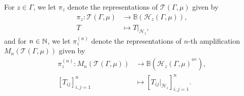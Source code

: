 \documentclass[12pt, class = article, crop = false, a4paper, twoside]{standalone}
\begin{document}
\begin{notation}

    For $z\in\Gamma$, we let $\pi_{z}$ denote the representations of $\mathcal{T}(\Gamma, \mu)$ given by
    \begin{equation}
        \begin{split}
            \pi_{z}\colon \mathcal{T}(\Gamma, \mu) & \to \mathbb{B}(\mathcal{H}_{z}(\Gamma, \mu)), \\
            T & \mapsto T|_{\mathcal{H}_{z}},
        \end{split}
    \end{equation}
    and for $n\in\mathbb{N}$, we let $\pi^{(n)}_{z}$ denote the representations of $n$-th amplification $M_{n}(\mathcal{T}(\Gamma, \mu))$ given by
    \begin{equation}
        \begin{split}
            \pi^{(n)}_{z}\colon M_{n}(\mathcal{T}(\Gamma, \mu)) & \to \mathbb{B}(\mathcal{H}_{z}(\Gamma, \mu)^{^{\oplus n}}), \\
            [T_{ij}]^{n}_{i, j = 1} & \mapsto [T_{ij}|_{\mathcal{H}_{z}}]^{n}_{i, j = 1}.
        \end{split}
    \end{equation}
\end{notation}
\end{document}
